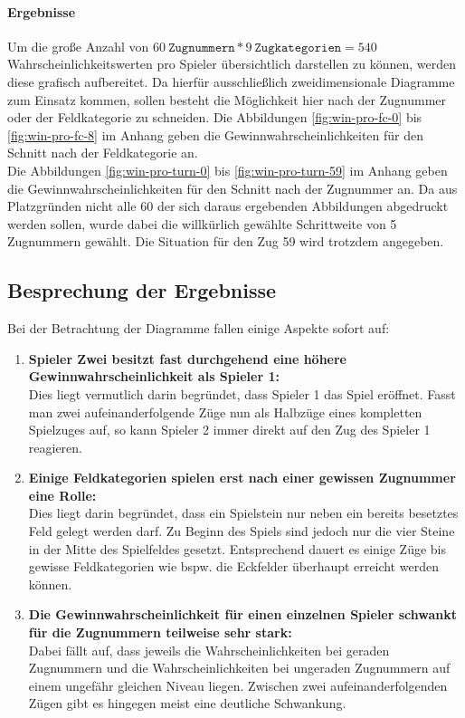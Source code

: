 \paragraph{Ergebnisse}
Um die große Anzahl von $60\ \mathtt{Zugnummern} * 9\ \mathtt{Zugkategorien} = 540$ Wahrscheinlichkeitswerten pro Spieler übersichtlich darstellen zu können, werden diese grafisch aufbereitet. Da hierfür ausschließlich zweidimensionale Diagramme zum Einsatz kommen, sollen besteht die Möglichkeit hier nach der Zugnummer oder der Feldkategorie zu schneiden. Die Abbildungen \ref{fig:win-pro-fc-0} bis \ref{fig:win-pro-fc-8} im Anhang geben die Gewinnwahrscheinlichkeiten für den Schnitt nach der Feldkategorie an.
\\Die Abbildungen \ref{fig:win-pro-turn-0} bis \ref{fig:win-pro-turn-59} im Anhang geben die Gewinnwahrscheinlichkeiten für den Schnitt nach der Zugnummer an. Da aus Platzgründen nicht alle 60 der sich daraus ergebenden Abbildungen abgedruckt werden sollen, wurde dabei die willkürlich gewählte Schrittweite von 5 Zugnummern gewählt. Die Situation für den Zug 59 wird trotzdem angegeben.

\subsection{Besprechung der Ergebnisse}
Bei der Betrachtung der Diagramme fallen einige Aspekte sofort auf:
\begin{enumerate}
\item \textbf{Spieler Zwei besitzt fast durchgehend eine höhere Gewinnwahrscheinlichkeit als Spieler 1:}
\\Dies liegt vermutlich darin begründet, dass Spieler 1 das Spiel eröffnet. Fasst man zwei aufeinanderfolgende Züge nun als Halbzüge eines kompletten Spielzuges auf, so kann Spieler 2 immer direkt auf den Zug des Spieler 1 reagieren.
\item \textbf{Einige Feldkategorien spielen erst nach einer gewissen Zugnummer eine Rolle:}
\\Dies liegt darin begründet, dass ein Spielstein nur neben ein bereits besetztes Feld gelegt werden darf. Zu Beginn des Spiels sind jedoch nur die vier Steine in der Mitte des Spielfeldes gesetzt. Entsprechend dauert es einige Züge bis gewisse Feldkategorien wie bspw. die Eckfelder überhaupt erreicht werden können.
\item \textbf{Die Gewinnwahrscheinlichkeit für einen einzelnen Spieler schwankt für die Zugnummern teilweise sehr stark:}
\\Dabei fällt auf, dass jeweils die Wahrscheinlichkeiten bei geraden Zugnummern und die Wahrscheinlichkeiten bei ungeraden Zugnummern auf einem ungefähr gleichen Niveau liegen. Zwischen zwei aufeinanderfolgenden Zügen gibt es hingegen meist eine deutliche Schwankung. 
\end{enumerate}